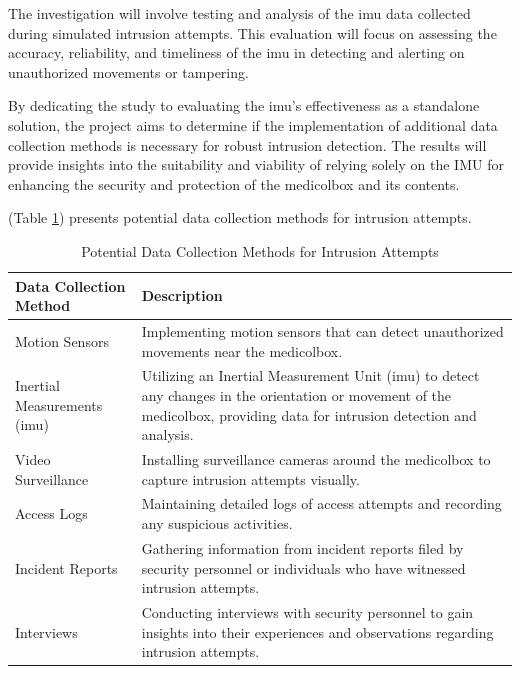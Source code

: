\documentclass[../main.tex]{subfiles}
\begin{document}
    The investigation will involve testing and analysis of the
    \gls{imu} data collected during simulated \gls{intrusion} attempts.
    This evaluation will focus on assessing the accuracy, reliability,
    and timeliness of the \gls{imu} in detecting and
    alerting on unauthorized movements or tampering.

    By dedicating the study to evaluating the \gls{imu}'s effectiveness as
    a standalone solution, the project aims to determine if the
    implementation of additional data collection methods is necessary for
    robust \gls{intrusion} detection.
    The results will provide insights into the suitability and viability of
    relying solely on the IMU for enhancing the security and
    protection of the \gls{medicolbox} and its contents.

    (Table \ref{tab:PotentialDataCollectionMethodsForIntrusionAttempts})
    presents potential data collection methods for \gls{intrusion} attempts.

    \begin{table}[htbp]
        \centering
        \caption{Potential Data Collection Methods for Intrusion Attempts}
        \label{tab:PotentialDataCollectionMethodsForIntrusionAttempts}
        \begin{tabular}{|l|p{10cm}|}
            \hline
            \textbf{Data Collection Method} & \textbf{Description} \\
            \hline
            Motion Sensors &
            Implementing motion sensors that can detect
            unauthorized movements near the \gls{medicolbox}. \\
            \hline
            Inertial Measurements (\gls{imu}) &
            Utilizing an Inertial Measurement Unit (\gls{imu}) to
            detect any changes in the orientation or
            movement of the \gls{medicolbox},
            providing data for \gls{intrusion} detection and analysis. \\
            \hline
            Video Surveillance &
            Installing surveillance cameras around the
            \gls{medicolbox} to capture \gls{intrusion} attempts visually. \\
            \hline
            Access Logs &
            Maintaining detailed logs of access attempts and
            recording any suspicious activities. \\
            \hline
            Incident Reports &
            Gathering information from incident reports filed by
            security personnel or individuals who
            have witnessed \gls{intrusion} attempts. \\
            \hline
            Interviews &
            Conducting interviews with security personnel to
            gain insights into their experiences and
            observations regarding \gls{intrusion} attempts. \\
            \hline
        \end{tabular}
    \end{table}
\end{document}
